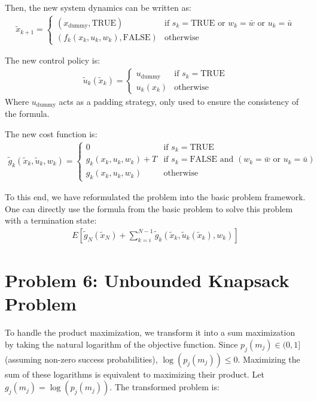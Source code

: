 \documentclass[11pt, a4paper, oneside]{memoir}
\begin{document}
Then, the new system dynamics can be written as:
\begin{align*}
  \tilde{x}_{k+1} = \begin{cases}
                      (x_{\text{dummy}}, \text{TRUE})    & \text{if } s_k = \text{TRUE} \text{ or } w_k = \bar{w} \text{ or } u_k = \bar{u} \\
                      (f_k(x_k, u_k, w_k), \text{FALSE}) & \text{otherwise}
                    \end{cases}
\end{align*}

The new control policy is:
\begin{align*}
  \tilde{u}_k(\tilde{x}_k) = \begin{cases}
                               u_{\text{dummy}} & \text{if } s_k = \text{TRUE} \\
                               u_k(x_k)         & \text{otherwise}
                             \end{cases}
\end{align*}
Where $u_{\text{dummy}}$ acts as a padding strategy, only used to ensure the consistency of the formula.

The new cost function is:
\begin{align*}
  \tilde{g}_k(\tilde{x}_k, \tilde{u}_k, w_k) = \begin{cases}
                                                 0                      & \text{if } s_k = \text{TRUE}                                                         \\
                                                 g_k(x_k, u_k, w_k) + T & \text{if } s_k = \text{FALSE} \text{ and } (w_k = \bar{w} \text{ or } u_k = \bar{u}) \\
                                                 g_k(x_k, u_k, w_k)     & \text{otherwise}
                                               \end{cases}
\end{align*}

To this end, we have reformulated the problem into the basic problem framework.
One can directly use the formula from the basic problem to solve this problem with a termination state:
\begin{align*}
  E\left[\tilde{g}_N(\tilde{x}_N) + \sum_{k=i}^{N-1} \tilde{g}_k(\tilde{x}_k, \tilde{u}_k(\tilde{x}_k), w_k) \right]
\end{align*}

\chapter{Problem 6: Unbounded Knapsack Problem}
To handle the product maximization,
we transform it into a sum maximization by taking the natural logarithm of the objective function.
Since $p_j(m_j) \in (0, 1]$ (assuming non-zero success probabilities), $\log(p_j(m_j)) \leq 0$.
Maximizing the sum of these logarithms is equivalent to maximizing their product.
Let $g_j(m_j) = \log(p_j(m_j))$. The transformed problem is:
\end{document}
